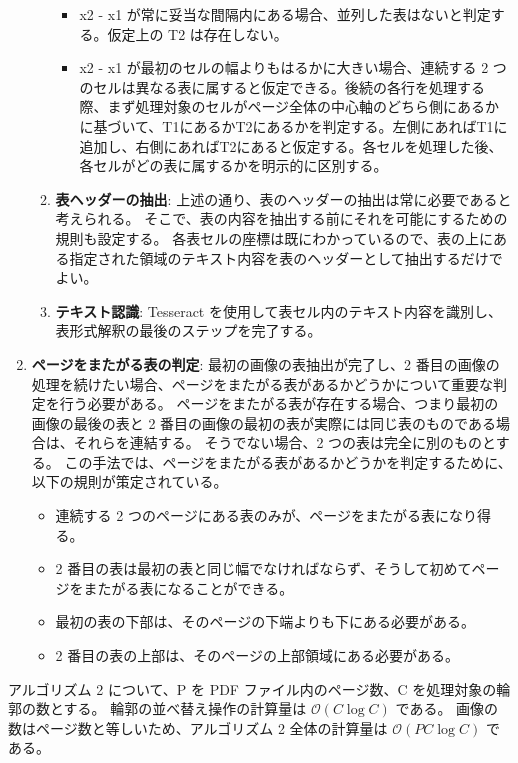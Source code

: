 \documentclass[uplatex, twocolumn,10pt]{jsarticle}
\begin{document}
\begin{enumerate}
\begin{enumerate}
        \begin{itemize}
            \item x2 - x1 が常に妥当な間隔内にある場合、並列した表はないと判定する。仮定上の T2 は存在しない。
            \item x2 - x1 が最初のセルの幅よりもはるかに大きい場合、連続する 2 つのセルは異なる表に属すると仮定できる。後続の各行を処理する際、まず処理対象のセルがページ全体の中心軸のどちら側にあるかに基づいて、T1にあるかT2にあるかを判定する。左側にあればT1に追加し、右側にあればT2にあると仮定する。各セルを処理した後、各セルがどの表に属するかを明示的に区別する。
        \end{itemize}
        \item \textbf{表ヘッダーの抽出}:
        上述の通り、表のヘッダーの抽出は常に必要であると考えられる。
        そこで、表の内容を抽出する前にそれを可能にするための規則も設定する。
        各表セルの座標は既にわかっているので、表の上にある指定された領域のテキスト内容を表のヘッダーとして抽出するだけでよい。
        \item \textbf{テキスト認識}:
        Tesseract を使用して表セル内のテキスト内容を識別し、表形式解釈の最後のステップを完了する。
    \end{enumerate}
    \item \textbf{ページをまたがる表の判定}:
    最初の画像の表抽出が完了し、2 番目の画像の処理を続けたい場合、ページをまたがる表があるかどうかについて重要な判定を行う必要がある。
    ページをまたがる表が存在する場合、つまり最初の画像の最後の表と 2 番目の画像の最初の表が実際には同じ表のものである場合は、それらを連結する。
    そうでない場合、2 つの表は完全に別のものとする。
    この手法では、ページをまたがる表があるかどうかを判定するために、以下の規則が策定されている。
    \begin{itemize}
        \item 連続する 2 つのページにある表のみが、ページをまたがる表になり得る。
        \item 2 番目の表は最初の表と同じ幅でなければならず、そうして初めてページをまたがる表になることができる。
        \item 最初の表の下部は、そのページの下端よりも下にある必要がある。
        \item 2 番目の表の上部は、そのページの上部領域にある必要がある。
    \end{itemize}
\end{enumerate}

アルゴリズム 2 について、P を PDF ファイル内のページ数、C を処理対象の輪郭の数とする。
輪郭の並べ替え操作の計算量は $\mathcal{O} (C \log C)$ である。
画像の数はページ数と等しいため、アルゴリズム 2 全体の計算量は $\mathcal{O} (PC \log C)$ である。
\end{document}
